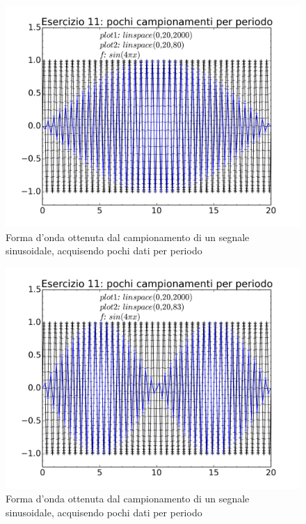 \documentclass[journal, a4paper]{IEEEtran}
\begin{document}
\begin{figure}
\centering
\includegraphics[width=0.9\linewidth]{./soluzione_es11_1batt}
\caption{Forma d'onda ottenuta dal campionamento di un segnale sinusoidale, acquisendo pochi dati per periodo}
\label{fig:soluzione_es11_1batt}
\end{figure}

\begin{figure}
\centering
\includegraphics[width=0.9\linewidth]{./soluzione_es11_2batt}
\caption{Forma d'onda ottenuta dal campionamento di un segnale sinusoidale, acquisendo pochi dati per periodo}
\label{fig:soluzione_es11_2batt}
\end{figure}
\end{document}

